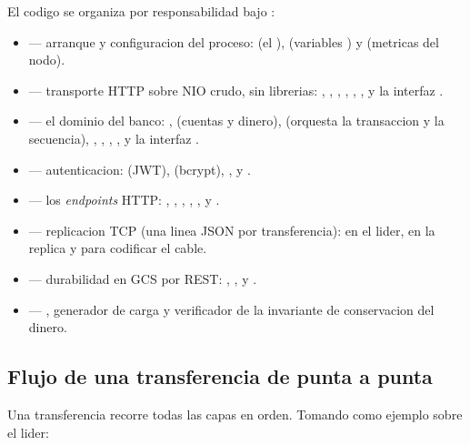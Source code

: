 El codigo se organiza por responsabilidad bajo :

\begin{itemize}
  \item {} --- arranque y configuracion del proceso: 
        (el ),  (variables ) y
         (metricas del nodo).
  \item {} --- transporte HTTP sobre NIO crudo, sin librerias:
        , , ,
        , , ,
         y la interfaz .
  \item {} --- el dominio del banco: ,
         (cuentas y dinero),  (orquesta la
        transaccion y la secuencia), , ,
        , ,  y la
        interfaz .
  \item {} --- autenticacion:  (JWT),
         (bcrypt), ,
         y .
  \item {} --- los \emph{endpoints} HTTP: ,
        , ,
        , ,
         y .
  \item {} --- replicacion TCP (una linea JSON por transferencia):
         en el lider,  en la replica y
         para codificar el cable.
  \item {} --- durabilidad en GCS por REST: ,
        ,  y .
  \item {} --- , generador de carga y
        verificador de la invariante de conservacion del dinero.
\end{itemize}

\subsection{Flujo de una transferencia de punta a punta}

Una transferencia recorre todas las capas en orden. Tomando como ejemplo
 sobre el lider:

